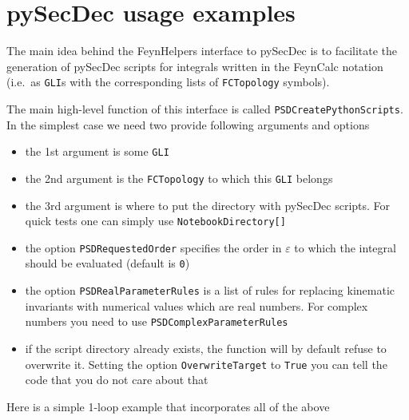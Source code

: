 \documentclass[../FeynHelpersManual.tex]{subfiles}
\begin{document}
\hypertarget{pysecdec usage examples}{
\section{pySecDec usage examples}\label{pysecdec usage examples}}

The main idea behind the FeynHelpers interface to pySecDec is to
facilitate the generation of pySecDec scripts for integrals written in
the FeynCalc notation (i.e.~as \texttt{GLI}s with the corresponding
lists of \texttt{FCTopology} symbols).

The main high-level function of this interface is called
\texttt{PSDCreatePythonScripts}. In the simplest case we need two
provide following arguments and options

\begin{itemize}
\tightlist
\item
  the 1st argument is some \texttt{GLI}
\item
  the 2nd argument is the \texttt{FCTopology} to which this \texttt{GLI}
  belongs
\item
  the 3rd argument is where to put the directory with pySecDec scripts.
  For quick tests one can simply use
  \texttt{NotebookDirectory[\allowbreak{}]}
\item
  the option \texttt{PSDRequestedOrder} specifies the order in
  \(\varepsilon\) to which the integral should be evaluated (default is
  \texttt{0})
\item
  the option \texttt{PSDRealParameterRules} is a list of rules for
  replacing kinematic invariants with numerical values which are real
  numbers. For complex numbers you need to use
  \texttt{PSDComplexParameterRules}
\item
  if the script directory already exists, the function will by default
  refuse to overwrite it. Setting the option \texttt{OverwriteTarget} to
  \texttt{True} you can tell the code that you do not care about that
\end{itemize}

Here is a simple 1-loop example that incorporates all of the above
\end{document}
